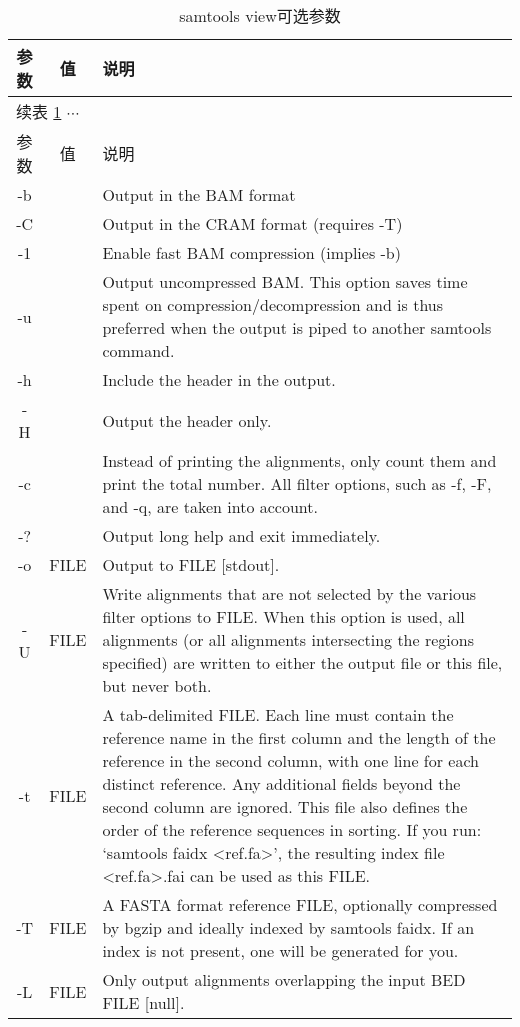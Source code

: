\begin{longtable}{|c|c|p{}|}
	\caption{samtools view可选参数} \label{table:samtools_view_options}\\
	\hline
	参数 & 值 & 说明\\
	\endfirsthead
	\multicolumn{3}{l}{续表 \ref{table:samtools_view_options} $ \cdots $} \\
	\hline
	参数 & 值 & 说明\\
	\endhead
	\hline 
	-b &  & Output in the BAM format \\ \hline
	-C &  & Output in the CRAM format (requires -T) \\ \hline
	-1 &  & Enable fast BAM compression (implies -b) \\ \hline
	-u &  & Output uncompressed BAM. This option saves time spent on compression/decompression and is thus preferred when the output is piped to another samtools command.  \\ \hline
	-h & & Include the header in the output. \\ \hline
	-H & & Output the header only. \\ \hline
	-c & & Instead of printing the alignments, only count them and print the total number. All filter options, such as -f, -F, and -q, are taken into account. \\ \hline
	-? & & Output long help and exit immediately. \\ \hline
	-o & FILE & Output to FILE [stdout]. \\ \hline
	-U & FILE & Write alignments that are not selected by the various filter options to FILE. When this option is used, all alignments (or all alignments intersecting the regions specified) are written to either the output file or this file, but never both. \\ \hline
	-t & FILE & A tab-delimited FILE. Each line must contain the reference name in the first column and the length of the reference in the second column, with one line for each distinct reference. Any additional fields beyond the second column are ignored. This file also defines the order of the reference sequences in sorting. If you run: `samtools faidx <ref.fa>', the resulting index file <ref.fa>.fai can be used as this FILE. \\ \hline
	-T & FILE & A FASTA format reference FILE, optionally compressed by bgzip and ideally indexed by samtools faidx. If an index is not present, one will be generated for you. \\ \hline
	-L & FILE & Only output alignments overlapping the input BED FILE [null]. \\ \hline

\end{longtable}
